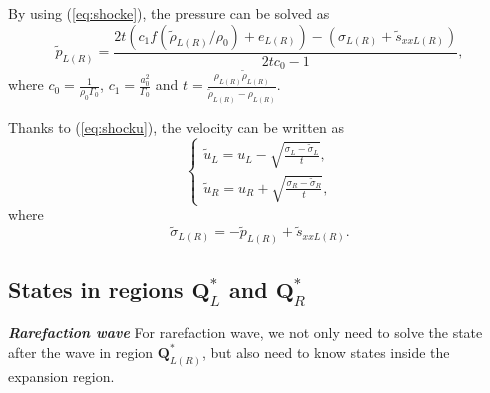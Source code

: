 \documentclass{article}
\numberwithin{equation}{section}
\numberwithin{table}{section}
\begin{document}

By using (\ref{eq:shocke}), the pressure can be solved as
\begin{equation}
  \tilde{p}_{L(R)}=
  \frac{2t(c_1f(\tilde{\rho}_{L(R)}/\rho_0)+e_{L(R)})-(\sigma_{L(R)}+\tilde{s}_{xxL(R)})}{2tc_0-1},
\end{equation}
where $c_0 = \frac{1}{\rho_0\Gamma_0}$, $c_1 = \frac{a_0^2}{\Gamma_0}$ and $ t=\frac{\rho_{L(R)} \tilde{\rho}_{L(R)}}{\tilde{\rho}_{L(R)}-\rho_{L(R)}}$.

Thanks to (\ref{eq:shocku}), the velocity can be written as
\begin{equation}
 \left\{ \begin{array}{ll}
   \tilde{u}_{L}= u_L -\sqrt{\frac{\sigma_L-\tilde{\sigma}_{L}}{t}},\\
	   \tilde{u}_{R} =   u_R +\sqrt{\frac{\sigma_R-\tilde{\sigma}_{R}}{t}},
   \end{array}
 \right.
 \end{equation}
 where
 \begin{equation}
   \tilde{\sigma}_{L(R)} = -\tilde{p}_{L(R)} + \tilde{s}_{xxL(R)}.
 \end{equation}

 \subsection{States in regions $\mathbf{Q}_{L}^*$  and  $\mathbf{Q}_{R}^*$}\label{sec:functions}

\emph{\textbf{Rarefaction wave}} For rarefaction wave,
we not only  need to solve the state after the wave in region $\mathbf{Q}_{L(R)}^*$, but also  need to know  states inside the expansion region.
\end{document}
